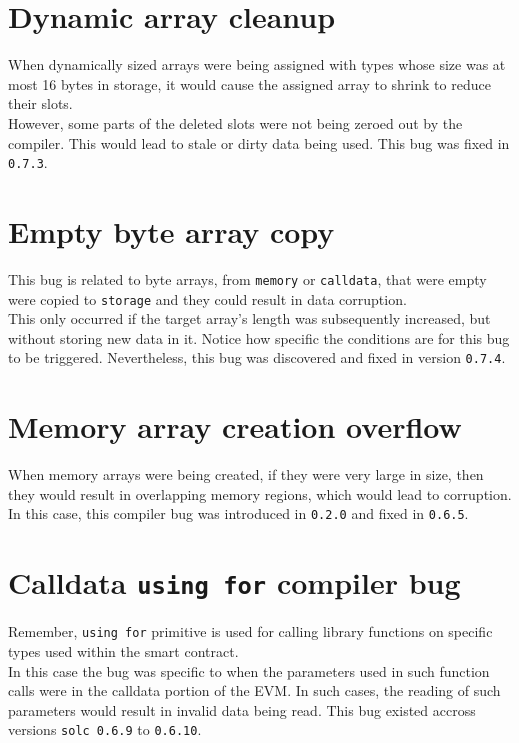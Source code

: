 \section{Dynamic array cleanup}
When dynamically sized arrays were being assigned with types whose size was at most 16 bytes in storage, it would cause the assigned array to shrink to reduce their slots. \\

However, some parts of the deleted slots were not being zeroed out by the compiler. This would lead to stale or dirty data being used. This bug was fixed in \texttt{0.7.3}.

\section{Empty byte array copy}
This bug is related to byte arrays, from \texttt{memory} or \texttt{calldata}, that were empty were copied to \texttt{storage} and they could result in data corruption. \\

This only occurred if the target array's length was subsequently increased, but without storing new data in it. Notice how specific the conditions are for this bug to be triggered. Nevertheless, this bug was discovered and fixed in version \texttt{0.7.4}.

\section{Memory array creation overflow}
When memory arrays were being created, if they were very large in size, then they would result in overlapping memory regions, which would lead to corruption.\\

In this case, this compiler bug was introduced in \texttt{0.2.0} and fixed in \texttt{0.6.5}.

\section{Calldata \texttt{using for} compiler bug}
Remember, \texttt{using for} primitive is used for calling library functions on specific types used within the smart contract. \\

In this case the bug was specific to when the parameters used in such function calls were in the calldata portion of the EVM. In such cases, the reading of such parameters would result in invalid data being read. This bug existed accross versions \texttt{solc 0.6.9} to \texttt{0.6.10}.

